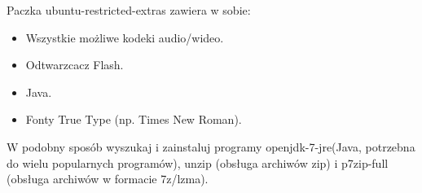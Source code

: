 Paczka \textcolor{ubuntu_orange}{ubuntu-restricted-extras} zawiera w sobie:
\begin{itemize}
\item Wszystkie możliwe kodeki audio/wideo.
\item Odtwarzcacz Flash.
\item Java.
\item Fonty True Type (np. Times New Roman).
\end{itemize}
W podobny sposób wyszukaj i zainstaluj programy \textcolor{ubuntu_orange}{openjdk-7-jre}(Java, potrzebna do wielu popularnych programów), \textcolor{ubuntu_orange}{unzip} (obsługa archiwów zip) i \textcolor{ubuntu_orange}{p7zip-full} (obsługa archiwów w formacie 7z/lzma).
\clearpage
